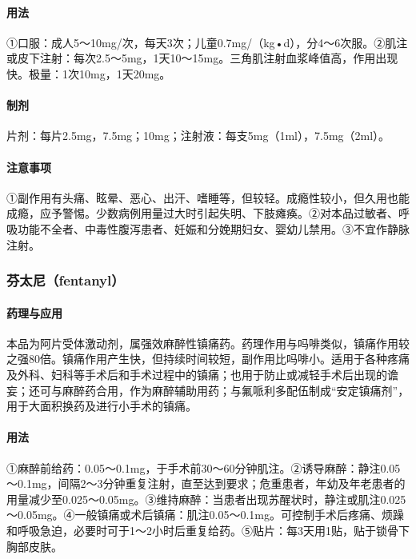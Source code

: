 \paragraph{用法}

①口服：成人5～10mg/次，每天3次；儿童0.7mg/（kg•d），分4～6次服。②肌注或皮下注射：每次2.5～5mg，1天10～15mg。三角肌注射血浆峰值高，作用出现快。极量：1次10mg，1天20mg。

\paragraph{制剂}

片剂：每片2.5mg，7.5mg；10mg；注射液：每支5mg（1ml），7.5mg（2ml）。

\paragraph{注意事项}

①副作用有头痛、眩晕、恶心、出汗、嗜睡等，但较轻。成瘾性较小，但久用也能成瘾，应予警惕。少数病例用量过大时引起失明、下肢瘫痪。②对本品过敏者、呼吸功能不全者、中毒性腹泻患者、妊娠和分娩期妇女、婴幼儿禁用。③不宜作静脉注射。

\subsubsection{芬太尼（fentanyl）}

\paragraph{药理与应用}

本品为阿片受体激动剂，属强效麻醉性镇痛药。药理作用与吗啡类似，镇痛作用较之强80倍。镇痛作用产生快，但持续时间较短，副作用比吗啡小。适用于各种疼痛及外科、妇科等手术后和手术过程中的镇痛；也用于防止或减轻手术后出现的谵妄；还可与麻醉药合用，作为麻醉辅助用药；与氟哌利多配伍制成“安定镇痛剂”，用于大面积换药及进行小手术的镇痛。

\paragraph{用法}

①麻醉前给药：0.05～0.1mg，于手术前30～60分钟肌注。②诱导麻醉：静注0.05～0.1mg，间隔2～3分钟重复注射，直至达到要求；危重患者，年幼及年老患者的用量减少至0.025～0.05mg。③维持麻醉：当患者出现苏醒状时，静注或肌注0.025～0.05mg。④一般镇痛或术后镇痛：肌注0.05～0.1mg。可控制手术后疼痛、烦躁和呼吸急迫，必要时可于1～2小时后重复给药。⑤贴片：每3天用1贴，贴于锁骨下胸部皮肤。

